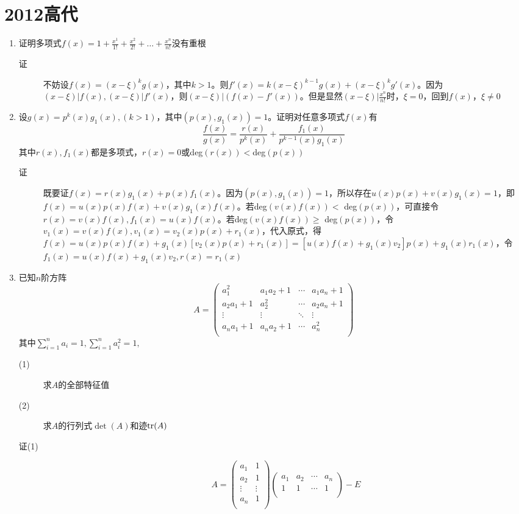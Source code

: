 \section{2012高代}
\begin{enumerate}
\item 证明多项式$f(x) = 1+ \frac{x^1}{1!}+ \frac{x^2}{2!}+ \dots+ \frac{x^n}{n!}$没有重根
\begin{description}
\item[证] 不妨设$f(x) = (x-\xi)^kg(x)$，其中$k > 1$。则$f'(x)=k(x-\xi)^{k-1}g(x)+(x-\xi)^kg'(x)$。因为$(x-\xi)|f(x),(x-\xi)|f'(x)$，则$(x-\xi)|(f(x)-f'(x))$。但是显然$(x-\xi)|\frac{x^n}{n!}$时，$\xi=0$，回到$f(x)$，$\xi \neq 0$
\end{description}


\item 设$g(x) = p^k(x)g_1(x),(k>1)$，其中$(p(x),g_1(x))=1$。证明对任意多项式$f(x)$有
\[
\frac{f(x)}{g(x)} = \frac{r(x)}{p^k(x)} + \frac{f_1(x)}{p^{k-1}(x)g_1(x)}
\]
其中$r(x),f_1(x)$都是多项式，$r(x)=0$或deg$(r(x))<$deg$(p(x))$
\begin{description}
\item[证] 既要证$f(x)=r(x)g_1(x)+p(x)f_1(x)$。因为$(p(x),g_1(x))=1$，所以存在$u(x)p(x)+v(x)g_1(x)=1$，即$f(x)=u(x)p(x)f(x)+v(x)g_1(x)f(x)$。若deg$(v(x)f(x))<$ deg$(p(x))$，可直接令$r(x)=v(x)f(x),f_1(x)=u(x)f(x)$。若deg$(v(x)f(x))\geq$ deg$(p(x))$，令$v_1(x)=v(x)f(x),v_1(x)=v_2(x)p(x)+r_1(x)$，代入原式，得$f(x)=u(x)p(x)f(x)+g_1(x)[v_2(x)p(x)+r_1(x)]=[u(x)f(x)+g_1(x)v_2]p(x)+g_1(x)r_1(x)$，令$f_1(x)=u(x)f(x)+g_1(x)v_2,r(x)=r_1(x)$
\end{description}

\item 已知$n$阶方阵
\[
A = \left(
\begin{array}{cccc}
a_1^2 &a_1a_2+1 & \cdots &a_1a_n+1 \\
a_2a_1+1 &a_2^2 & \cdots &a_2a_n+1 \\
\vdots &\vdots & \ddots &\vdots \\
a_na_1+1 &a_na_2+1 & \cdots &a_n^2 \\
\end{array}\right)
\]
其中$\sum_{i=1}^na_i=1,\sum_{i=1}^na_i^2=1,$
\begin{description}
\item[(1)] 求$A$的全部特征值
\item[(2)] 求$A$的行列式$\det(A)$和迹$\operatorname{tr}(A)$
\item[证(1)]
\[
A=\left(
\begin{array}{cc}
a_1 & 1\\
a_2 & 1\\
\vdots & \vdots \\
a_n & 1\\
\end{array}\right)
\left(
\begin{array}{cccc}
a_1 & a_2 & \cdots & a_n \\
1 & 1 & \cdots & 1 \\
\end{array}\right)-E
\]
\end{description}


\end{enumerate}
